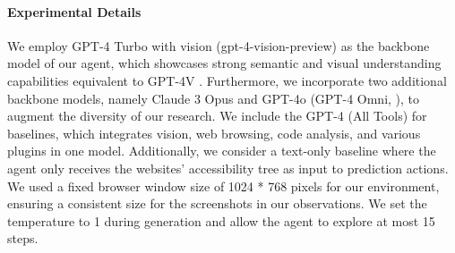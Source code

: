 \documentclass[11pt]{article}
\begin{document}
\paragraph{Experimental Details}
We employ GPT-4 Turbo with vision (gpt-4-vision-preview) as the backbone model of our agent, which showcases strong semantic and visual understanding capabilities equivalent to GPT-4V \citep{openai2023gpt4}. Furthermore, we incorporate two additional backbone models, namely Claude 3 Opus \citep{anthropic2024introducing} and GPT-4o (GPT-4 Omni, \citealp{openai2024hello}), to augment the diversity of our research. We include the GPT-4 (All Tools) for baselines, which integrates vision, web browsing, code analysis, and various plugins in one model. Additionally, we consider a text-only baseline where the agent only receives the websites' accessibility tree as input to prediction actions.  %
We used a fixed browser window size of 1024 * 768 pixels for our environment, ensuring a consistent size for the screenshots in our observations. We set the temperature to 1 during generation and allow the agent to explore at most 15 steps. 








\end{document}
